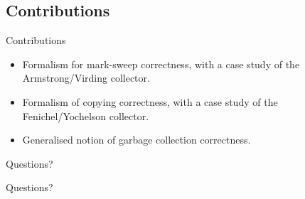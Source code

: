 \documentclass[usenames,dvipsnames]{beamer}
\begin{document}
\subsection{Contributions}

\begin{frame}{Contributions}
  \begin{itemize}
  \item Formalism for mark-sweep correctness, with a case study of the
    Armstrong/Virding collector.
  \item Formalism of copying correctness, with a case study of the
    Fenichel/Yochelson collector.
  \item Generalised notion of garbage collection correctness.
  \end{itemize}

\end{frame}


\begin{frame}{Questions?}
  \begin{center}
    \huge Questions?
  \end{center}

  
  \nocite{Myreen10,McCreight07}
  \footnotesize
  


\end{frame}

\end{document}
